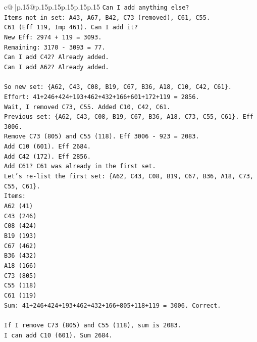 \documentclass{article}
\begin{document}
{\begin{supertabular}{c@{$\;$}|p{.15\linewidth}@{}p{.15\linewidth}p{.15\linewidth}p{.15\linewidth}p{.15\linewidth}p{.15\linewidth}}
{{{\texttt{Can I add anything else?} \\
\texttt{Items not in set: A43, A67, B42, C73 (removed), C61, C55.} \\
\texttt{C61 (Eff 119, Imp 461). Can I add it?} \\
\texttt{New Eff: 2974 + 119 = 3093.} \\
\texttt{Remaining: 3170 {-} 3093 = 77.} \\
\texttt{Can I add C42? Already added.} \\
\texttt{Can I add A62? Already added.} \\
\\ 
\texttt{So new set: \{A62, C43, C08, B19, C67, B36, A18, C10, C42, C61\}.} \\
\texttt{Effort: 41+246+424+193+462+432+166+601+172+119 = 2856.} \\
\texttt{Wait, I removed C73, C55. Added C10, C42, C61.} \\
\texttt{Previous set: \{A62, C43, C08, B19, C67, B36, A18, C73, C55, C61\}. Eff 3006.} \\
\texttt{Remove C73 (805) and C55 (118). Eff 3006 {-} 923 = 2083.} \\
\texttt{Add C10 (601). Eff 2684.} \\
\texttt{Add C42 (172). Eff 2856.} \\
\texttt{Add C61? C61 was already in the first set.} \\
\texttt{Let's re{-}list the first set: \{A62, C43, C08, B19, C67, B36, A18, C73, C55, C61\}.} \\
\texttt{Items:} \\
\texttt{A62 (41)} \\
\texttt{C43 (246)} \\
\texttt{C08 (424)} \\
\texttt{B19 (193)} \\
\texttt{C67 (462)} \\
\texttt{B36 (432)} \\
\texttt{A18 (166)} \\
\texttt{C73 (805)} \\
\texttt{C55 (118)} \\
\texttt{C61 (119)} \\
\texttt{Sum: 41+246+424+193+462+432+166+805+118+119 = 3006. Correct.} \\
\\ 
\texttt{If I remove C73 (805) and C55 (118), sum is 2083.} \\
\texttt{I can add C10 (601). Sum 2684.} \\
}}}
\end{supertabular}}
\end{document}
